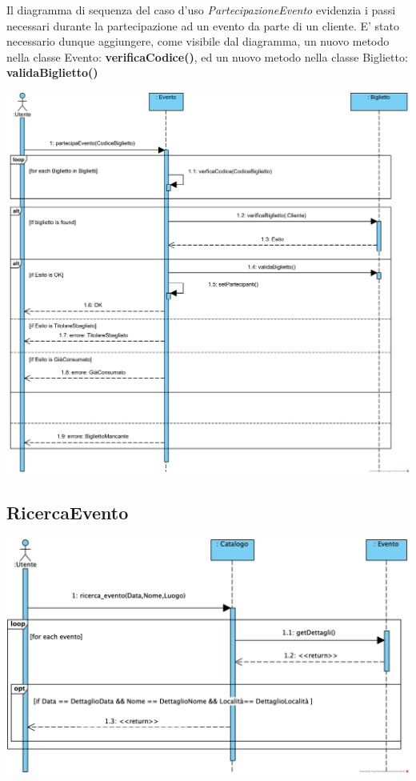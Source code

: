 \begin{center}
Il diagramma di sequenza del caso d’uso \textit{PartecipazioneEvento} evidenzia i passi necessari durante la partecipazione ad un evento da parte di un cliente. E' stato necessario dunque aggiungere, come visibile dal diagramma, un nuovo metodo nella classe Evento: \textbf{verificaCodice()}, ed un nuovo metodo nella classe Biglietto: \textbf{validaBiglietto()}

\vspace{1ex}
\includegraphics[height=0.38\textheight]{assets/casid'uso/PartecipazioneEvento.png}
\vspace{1ex}
\end{center}
\subsection{RicercaEvento}
\begin{center}
\includegraphics[height=0.38\textheight]{assets/casid'uso/RicercaEvento.png}
\vspace{1ex}
\end{center}

